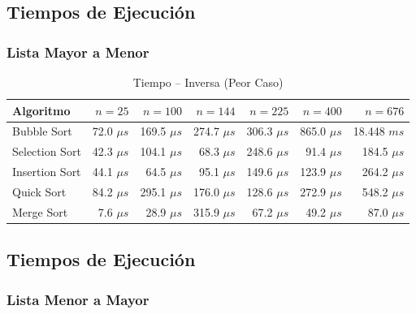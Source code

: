 \documentclass[12pt]{article}
\begin{document}
\subsection*{Tiempos de Ejecución}
\subsubsection*{Lista Mayor a Menor}
\begin{table}[H]
\centering
\caption{Tiempo -- Inversa (Peor Caso)}
\begin{tabular}{lrrrrrr}
\toprule
\textbf{Algoritmo} & \textbf{$n=25$} & \textbf{$n=100$} & \textbf{$n=144$} & \textbf{$n=225$} & \textbf{$n=400$} & \textbf{$n=676$} \\
\midrule
Bubble Sort    & 72.0 $\mu s$  & 169.5 $\mu s$ & 274.7 $\mu s$ & 306.3 $\mu s$ & 865.0 $\mu s$ & 18.448 $ms$   \\
Selection Sort & 42.3 $\mu s$  & 104.1 $\mu s$ & 68.3 $\mu s$  & 248.6 $\mu s$ & 91.4 $\mu s$  & 184.5 $\mu s$ \\
Insertion Sort & 44.1 $\mu s$  & 64.5 $\mu s$  & 95.1 $\mu s$  & 149.6 $\mu s$ & 123.9 $\mu s$ & 264.2 $\mu s$ \\
Quick Sort     & 84.2 $\mu s$  & 295.1 $\mu s$ & 176.0 $\mu s$ & 128.6 $\mu s$ & 272.9 $\mu s$ & 548.2 $\mu s$ \\
Merge Sort     & 7.6 $\mu s$   & 28.9 $\mu s$  & 315.9 $\mu s$ & 67.2 $\mu s$  & 49.2 $\mu s$  & 87.0 $\mu s$  \\
\bottomrule
\end{tabular}
\end{table}

\subsection*{Tiempos de Ejecución }
\subsubsection*{Lista Menor a Mayor}
\end{document}
